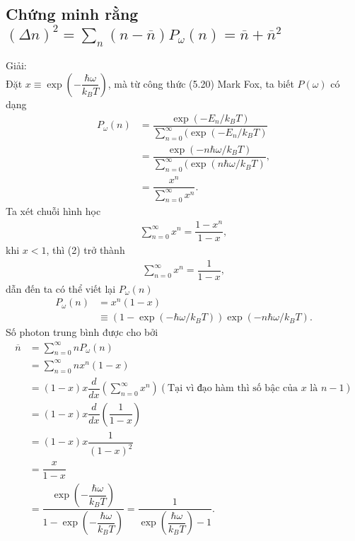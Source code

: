 \documentclass{article}
\newcommand{\dps}{\displaystyle}
\newcommand{\f}[2]{\dfrac{#1}{#2}}
\begin{document}
\subsection*{Chứng minh rằng $(\Delta n)^2 = \dps\sum_{n} (n - \overline{n}) P_{\omega}(n) = \overline{n} + \overline{n}^2$}
Giải: \\
Đặt $x \equiv \exp(-\f{\hbar \omega}{k_B T})$, mà từ công thức (5.20) Mark Fox, ta biết $P(\omega)$ có dạng
\begin{align*}
	P_{\omega}(n)
	 & = \f{\exp(-E_{n} / k_B T)}{\sum_{n = 0}^{\infty}(\exp(-E_{n} / k_B T)}                   \\
	 & = \f{\exp(-n \hbar \omega / k_B T)}{\sum_{n = 0}^{\infty}(\exp(n \hbar \omega / k_B T)}, \\
	 & = \f{x^{n}}{\sum_{n = 0}^{\infty} x^{n}}. \tag{1}
\end{align*}
Ta xét chuỗi hình học
\begin{align*}
	\sum_{n = 0}^{\infty} x^{n} = \f{1 - x^n}{1 - x} \tag{2},
\end{align*}
khi $x<1$, thì (2) trở thành
\begin{align*}
	\sum_{n = 0}^{\infty} x^{n} = \f{1}{1 - x}, \tag{3}
\end{align*}
dẫn đến ta có thể viết lại $P_{\omega}(n)$
\begin{align*}
	P_{\omega}(n)
	 & = x^{n} (1-x)                                                                               \\
	 & \equiv \left( 1 - \exp(-\hbar \omega / k_B T) \right) \exp(-n\hbar \omega / k_B T). \tag{4}
\end{align*}
Số photon trung bình được cho bởi
\begin{align*}
	\overline{n}
	 & = \sum_{n = 0}^{\infty} n P_{\omega}(n)                                                                                       \\
	 & = \sum_{n = 0}^{\infty} n x^{n} (1-x)                                                                                         \\
	 & = (1 - x) x \f{d}{dx} \left( \sum_{n = 0}^{\infty} x^{n} \right) (\text{Tại vì đạo hàm thì số bậc của $x$ là $n - 1$})        \\
	 & = (1 - x) x \f{d}{dx} \left(\f{1}{1 - x}\right)                                                                               \\
	 & = (1 - x) x \f{1}{(1 - x)^2}                                                                                                  \\
	 & = \f{x}{1 - x}                                                                                                                \\
	 & = \f{\exp(-\f{\hbar \omega}{k_B T})}{1 - \exp(-\f{\hbar \omega}{k_B T})} = \f{1}{\exp(\f{\hbar \omega}{k_B T}) - 1} . \tag{5}
\end{align*}
\end{document}
